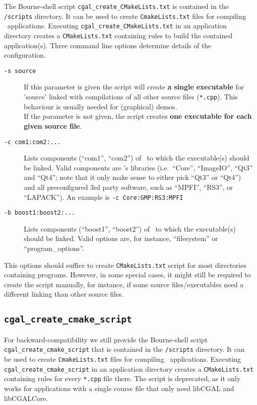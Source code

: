 The Bourne-shell script \texttt{cgal\_create\_CMakeLists.txt} is contained in the
\texttt{\cgalrel/scripts} directory. It can be used to create
\texttt{CmakeLists.txt} files for compiling \cgal\ applications. Executing
\texttt{cgal\_create\_CMakeLists.txt} in an application directory creates a
\texttt{CMakeLists.txt} containing rules to build the contained
application(s). Three command line options determine details of the
configuration.

\begin{description}
\item [\texttt{-s source}] If this parameter is given the script will
  create \textbf{a single executable} for 'source' linked with
  compilations of all other source files (\texttt{*.cpp}). This
  behaviour is usually needed for (graphical) demos. \\
  If the parameter is not given, the script creates \textbf{one executable for each given
  source file}.
\item [\texttt{-c com1:com2:...}] Lists components (``com1'',
  ``com2'') of \cgal\ to which the executable(s) should be linked. Valid components are \cgal's
  libraries (i.e.~``Core'', ``ImageIO'', ``Qt3'' and ``Qt4''; note
  that it only make sense to either pick ``Qt3'' or ``Qt4'') and all
  preconfigured 3rd party software, such as ``MPFI'', ``RS3'',
  or ``LAPACK''). An example is \texttt{-c Core:GMP:RS3:MPFI}

\item [\texttt{-b boost1:boost2:...}] Lists components (``boost1'',
  ``boost2'') of \boost\ to which the executable(s) should be
  linked. Valid options are, for instance, ``filesystem'' or ``program\_options''.

\end{description}

This options should suffice to create \texttt{CMakeLists.txt} script
for most directories containing programs. However, in some special
cases, it might still be required to create the script manually, for
instance, if some source files/executables need a different linking than
other source files. 

\subsection{\texttt{cgal\_create\_cmake\_script\label{sec:create_cgal_cmake_script}}}

For backward-compatibility we still provide the 
Bourne-shell script \texttt{cgal\_create\_cmake\_script} that 
is contained in the
\texttt{\cgalrel/scripts} directory. It can be used to create
\texttt{CmakeLists.txt} files for compiling \cgal\ applications. Executing
\texttt{cgal\_create\_cmake\_script} in an application directory creates a
\texttt{CMakeLists.txt} containing rules for every \texttt{*.cpp} file
there. The script is deprecated, as it only works for applications 
with a single course file that only need libCGAL and libCGALCore.




